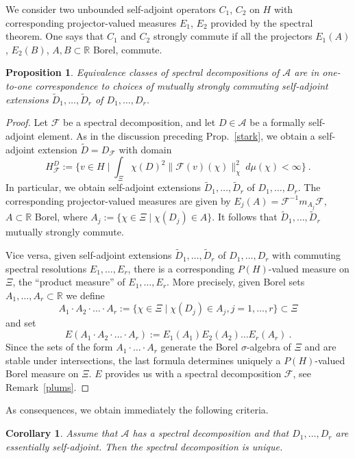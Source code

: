 \documentclass[10]{amsart}
\newtheorem{cor}[thm]{Corollary}
\newtheorem{pro}[thm]{Proposition}
\theoremstyle{remark}
\theoremstyle{definition}
\numberwithin{equation}{section}
\newcommand{\R}{\mathbb{R}}           %
\newcommand{\Cal}{\mathcal}
\newcommand{\defn}{{:=}}
\begin{document}
{We consider two unbounded self-adjoint operators $C_1$, $C_2$ on $H$ with corresponding projector-valued measures $E_1$, $E_2$ provided
by the spectral theorem. One says that $C_1$ and $C_2$ strongly commute if all the projectors $E_1(A)$, $E_2(B)$, $A,B\subset \R$ Borel, commute.

\begin{pro}\label{schwach} Equivalence classes of spectral decompositions of $\Cal A$ are in one-to-one correspondence to choices of mutually strongly commuting  self-adjoint extensions $\tilde D_1,\dots,\tilde D_r$ of $D_1,\dots,D_r$.
\end{pro}
\begin{proof} Let $\Cal F$ be a spectral decomposition, and let $D\in\Cal A$ be a formally self-adjoint element. As in the discussion preceding Prop.~\ref{stark}, we obtain
a self-adjoint extension $\tilde D=D_\Cal F$ with domain  
$$H_{\Cal F}^D\defn \{v\in H\mid \int_\Xi\chi(D)^2 \|\Cal F(v)(\chi)\|_\chi^2\: d\mu(\chi)<\infty\}\ .$$
In particular, we obtain self-adjoint extensions  $\tilde D_1,\dots,\tilde D_r$ of $D_1,\dots,D_r$. The corresponding projector-valued measures are given
by $E_j(A)=\Cal F^{-1} m_{A_j}\Cal F$, $A\subset \R$ Borel, where $A_j\defn\{\chi\in\Xi\mid\chi(D_j) \in A\}$. It follows that $\tilde D_1,\dots,\tilde D_r$  mutually strongly commute.

Vice versa, given self-adjoint extensions $\tilde D_1,\dots,\tilde D_r$ of $D_1,\dots,D_r$ with commuting spectral resolutions $E_1,\dots,E_r$, there is
a corresponding $P(H)$-valued measure on $\Xi$, the ``product measure'' of $E_1,\dots, E_r$. More precisely, given Borel sets $A_1,\dots, A_r\subset \R$
we define
$$ A_1\cdot A_2\cdot\dots\cdot A_r\defn\{\chi\in\Xi\mid \chi(D_j)\in A_j, j=1,\dots,r\}\subset \Xi$$
and set
$$ E( A_1\cdot A_2\cdot \dots \cdot A_r)\defn E_1(A_1)E_2(A_2)\dots E_r(A_r)\ .$$
Since the sets of the form $A_1\cdot\dots\cdot A_r$ generate the Borel $\sigma$-algebra of $\Xi$ and are stable under intersections, the last formula determines uniquely
a $P(H)$-valued Borel measure on $\Xi$. $E$ provides us with a spectral decomposition $\Cal F$, see Remark~\ref{plums}.
\end{proof} 
As consequences, we obtain immediately the following criteria.
\begin{cor}\label{karl} Assume that $\Cal A$ has a spectral decomposition and that $D_1,\dots,D_r$ are essentially self-adjoint. Then the spectral decomposition is unique.
\end{cor}

}
\end{document}
